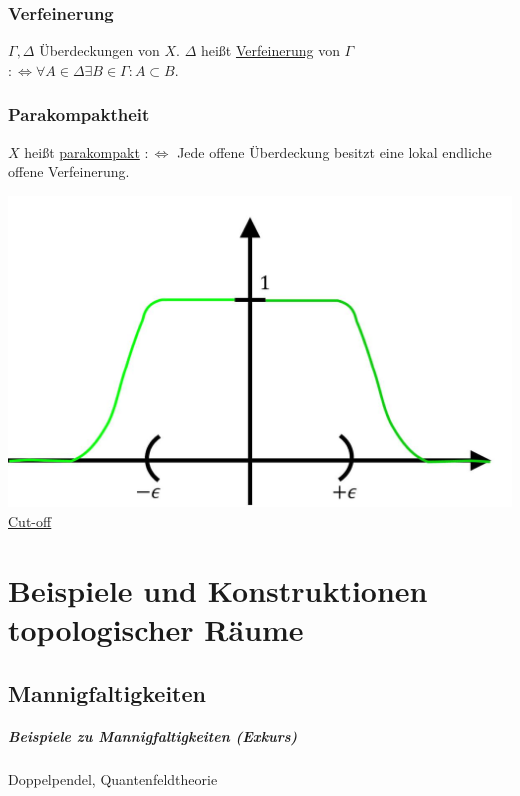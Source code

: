 \documentclass[a4paper,11pt,notitlepage]{report}
\newenvironment{Kasten}[1]
{
\hspace{0.05\linewidth}
\begin{center}
\begin{minipage}{0.9\linewidth}
\setlength{\fboxsep}{10pt}
\definecolor{shadecolor}{gray}{1}
\definecolor{framecolor}{gray}{0}
\def\FrameCommand{\fcolorbox{framecolor}{shadecolor}}
\MakeFramed {\FrameRestore}
\subsection{#1}
\begin{itshape}
}
{
\end{itshape}
\endMakeFramed
\end{minipage}
\end{center}
}
\begin{document}
\begin{Kasten}{Verfeinerung}
	$\Gamma, \Delta$ Überdeckungen von $X$. $\Delta$ heißt \underline{Verfeinerung} von $\Gamma$ \newline $:\Leftrightarrow \forall A \in \Delta \exists B \in \Gamma \colon A \subset B$.
\end{Kasten} 

\begin{Kasten}{Parakompaktheit}
	$X$ heißt \underline{parakompakt} $:\Leftrightarrow$ Jede offene Überdeckung besitzt eine lokal endliche offene Verfeinerung. 
\end{Kasten}


\includegraphics[scale=0.5]{images/Cutoff.jpg} \underline{\underline{Cut-off}}

\chapter{Beispiele und Konstruktionen topologischer Räume}
\section{Mannigfaltigkeiten}

\paragraph{Beispiele zu Mannigfaltigkeiten (Exkurs)} Doppelpendel, Quantenfeldtheorie
\end{document}
